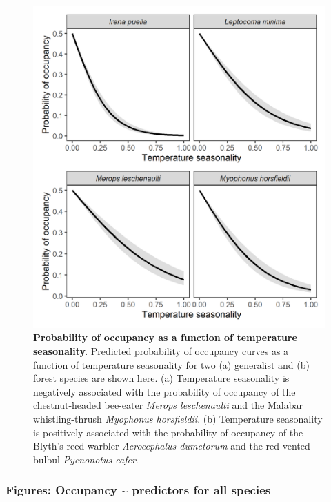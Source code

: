 \documentclass[
]{article}
\begin{document}
\begin{figure}
\centering
\includegraphics{figs/fig_05.png}
\caption{\textbf{Probability of occupancy as a function of temperature seasonality.}
Predicted probability of occupancy curves as a function of temperature seasonality for two (a) generalist and (b) forest species are shown here. (a) Temperature seasonality is negatively associated with the probability of occupancy of the chestnut-headed bee-eater \emph{Merops leschenaulti} and the Malabar whistling-thrush \emph{Myophonus horsfieldii}. (b) Temperature seasonality is positively associated with the probability of occupancy of the Blyth's reed warbler \emph{Acrocephalus dumetorum} and the red-vented bulbul \emph{Pycnonotus cafer}.}
\end{figure}

\hypertarget{figures-occupancy-predictors-for-all-species}{%
\subsubsection{Figures: Occupancy \textasciitilde{} predictors for all species}\label{figures-occupancy-predictors-for-all-species}}
\end{document}
